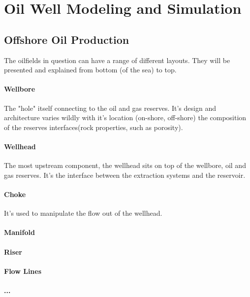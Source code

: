 

\chapter{Oil Well Modeling and Simulation} \label{chap:2}


\section{Offshore Oil Production}

The oilfields in question can have a range of different layouts. They will be presented and explained from bottom (of the sea) to top.

\subsubsection{Wellbore}
The "hole" itself connecting to the oil and gas reserves. It's design and architecture varies wildly with it's location (on-shore, off-shore) the composition of the reserves interfaces(rock properties, such as porosity).

\subsubsection{Wellhead}
The most upstream component, the wellhead sits on top of the wellbore, oil and gas reserves. It's the interface between the extraction systems and the reservoir.

\subsubsection{Choke}
It's used to manipulate the flow out of the wellhead.



\subsubsection{Manifold}

\subsubsection{Riser}

\subsubsection{Flow Lines}

\subsubsection{...}


